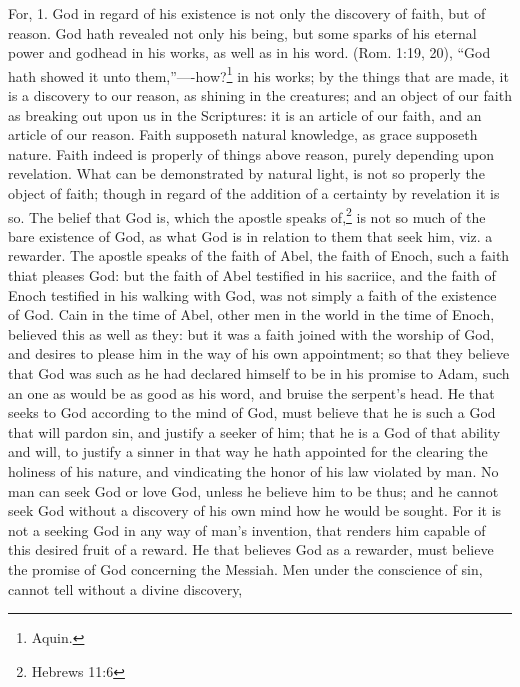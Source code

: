 \documentclass[a5paper]{book}
\begin{document}
For, 1. God in regard of his existence is not only the discovery of faith, 
    but of reason. 
God hath revealed not only his being, 
    but some sparks of his eternal power and godhead in his works, 
    as well as in his word. 
(Rom. 1:19, 20), “God hath showed it unto them,”----how?\footnote{Aquin.}
    in his works; by the things that are made, 
    it is a discovery to our reason, as shining in the creatures; 
    and an object of our faith as breaking out upon us in the Scriptures: 
    it is an article of our faith, and an article of our reason. 
Faith supposeth natural knowledge, as grace supposeth nature. 
Faith indeed is properly of things above reason, 
    purely depending upon revelation. 
What can be demonstrated by natural light, 
    is not so properly the object of faith;
    though in regard of the addition of a certainty by revelation it is so.
The belief that God is, which the apostle speaks of,\footnote{Hebrews 11:6}
    is not so much of the bare existence of God, 
    as what God is in relation to them that
    seek him, viz. a rewarder.  %
The apostle speaks of the faith of Abel,
    the faith of Enoch, 
    such a faith thiat pleases God: 
    but the faith of Abel testified in his sacriice, 
    and the faith of Enoch testified in his walking with God, 
    was not simply a faith of the existence of God.
Cain in the time of Abel, 
    other men in the world in the time of Enoch, 
    believed this as well as they: 
    but it was a faith joined with the worship of God, 
    and desires to please him in the way of his own appointment; 
    so that they believe that God was 
    such as he had declared himself to be in his promise to Adam, 
    such an one as would be as good as his word, 
    and bruise the serpent’s head. 
He that seeks to God according to the mind of God, 
    must believe that he is such a God that will pardon sin, 
    and justify a seeker of him; 
    that he is a God of that ability and will, 
    to justify a sinner in that way he hath appointed 
    for the clearing the holiness of his nature, 
    and vindicating the honor of his law violated by man. 
No man can seek God or love God, 
    unless he believe him to be thus; 
    and he cannot seek God without a discovery of his own mind 
    how he would be sought. 
For it is not a seeking God in any way of man's invention, 
    that renders him capable of this desired fruit of a reward. 
He that believes God as a rewarder, 
    must believe the promise of God concerning the Messiah. 
Men under the conscience of sin, 
    cannot tell without a divine discovery, 
\end{document}
